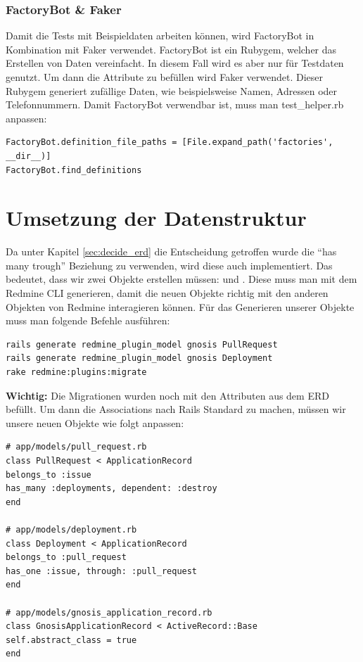 \subsubsection{FactoryBot \& Faker}
Damit die Tests mit Beispieldaten arbeiten können, wird FactoryBot in Kombination mit Faker verwendet. FactoryBot ist ein
Rubygem, welcher das Erstellen von Daten vereinfacht. In diesem Fall wird es aber nur für Testdaten genutzt. Um dann die
Attribute zu befüllen wird Faker verwendet. Dieser Rubygem generiert zufällige Daten, wie beispielsweise Namen, Adressen
oder Telefonnummern. \newline
Damit FactoryBot verwendbar ist, muss man test\_helper.rb anpassen:
\begin{codebox}[]
  \begin{verbatim}
FactoryBot.definition_file_paths = [File.expand_path('factories', __dir__)]
FactoryBot.find_definitions
  \end{verbatim}
\end{codebox}

\section{Umsetzung der Datenstruktur}
Da unter Kapitel \ref{sec:decide_erd} die Entscheidung getroffen wurde die \enquote{has many trough} Beziehung zu
verwenden, wird diese auch implementiert. Das bedeutet, dass wir zwei Objekte erstellen müssen: 
 und . Diese muss man mit dem Redmine CLI generieren,
damit die neuen Objekte richtig mit den anderen Objekten von Redmine interagieren können. Für das Generieren unserer
Objekte muss man folgende Befehle ausführen:
\begin{codebox}[]
  \begin{verbatim}
rails generate redmine_plugin_model gnosis PullRequest 
rails generate redmine_plugin_model gnosis Deployment
rake redmine:plugins:migrate
  \end{verbatim}
\end{codebox}
\textbf{Wichtig:} Die Migrationen wurden noch mit den Attributen aus dem ERD befüllt. \newline
Um dann die Associations nach Rails Standard zu machen, müssen wir unsere neuen Objekte wie folgt anpassen:
\begin{codebox}[]
  \begin{verbatim}
# app/models/pull_request.rb
class PullRequest < ApplicationRecord
belongs_to :issue
has_many :deployments, dependent: :destroy
end

# app/models/deployment.rb
class Deployment < ApplicationRecord
belongs_to :pull_request
has_one :issue, through: :pull_request
end

# app/models/gnosis_application_record.rb
class GnosisApplicationRecord < ActiveRecord::Base
self.abstract_class = true
end
  \end{verbatim}
\end{codebox}

